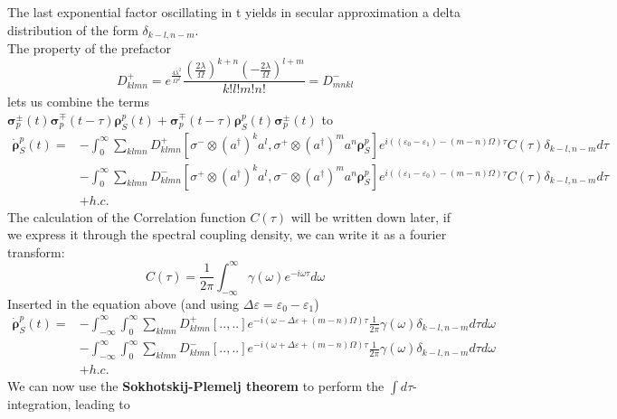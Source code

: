 	The last exponential factor oscillating in t yields in secular approximation a delta distribution of the form $\delta_{k-l, n-m}$.\\
	The property of the prefactor
	\begin{equation}
		D_{klmn}^+ =	e^{\frac{4\lambda^2}{\Omega^2}} \frac{\left(\frac{2\lambda}{\Omega}\right)^{k + n} \left(-\frac{2\lambda}{\Omega}\right)^{l + m}}{k! l! m! n!} =	D_{mnkl}^-
	\end{equation}
	lets us combine the terms $\boldsymbol{\sigma}_p^\pm(t)\boldsymbol{\sigma}_p^\mp(t- \tau) \boldsymbol{\rho}_S^p(t) + \boldsymbol{\sigma}_p^\mp(t- \tau) \boldsymbol{\rho}_S^p(t)\boldsymbol{\sigma}_p^\pm(t)$ to
	\begin{align*}
		\dot{\boldsymbol{\rho}}_S^p(t) =	&- \int_{0}^{\infty} \sum_{klmn}^{} D_{klmn}^+ \left[\sigma^- \otimes (a^\dagger)^k a^l, \sigma^+ \otimes (a^\dagger)^m a^n \boldsymbol{\rho}_S^p\right] e^{i((\varepsilon_0 - \varepsilon_1) - (m-n)\Omega) \tau} C(\tau) \delta_{k-l, n-m} d\tau \\
		&- \int_{0}^{\infty} \sum_{klmn}^{} D_{klmn}^- \left[\sigma^+ \otimes (a^\dagger)^k a^l, \sigma^- \otimes (a^\dagger)^m a^n \boldsymbol{\rho}_S^p\right] e^{i((\varepsilon_1 - \varepsilon_0) - (m-n)\Omega) \tau} C(\tau) \delta_{k-l, n-m} d\tau \\
		&+ h.c.
	\end{align*}
	The calculation of the Correlation function $C(\tau)$ will be written down later, if we express it through the spectral coupling density, we can write it as a fourier transform:
	\begin{equation}
		C(\tau) =	\frac{1}{2 \pi} \int_{-\infty}^{\infty} \gamma(\omega) e^{-i \omega \tau}d\omega
	\end{equation}
	Inserted in the equation above (and using $\Delta \varepsilon =	\varepsilon_0 - \varepsilon_1$)
	\begin{align*}
		\dot{\boldsymbol{\rho}}_S^p(t) =	&- \int_{-\infty}^{\infty}\int_{0}^{\infty} \sum_{klmn}^{} D_{klmn}^+ \left[..,..\right] e^{-i(\omega - \Delta \varepsilon + (m-n)\Omega) \tau} \frac{1}{2\pi}\gamma(\omega) \delta_{k-l, n-m} d\tau d\omega \\
		&- \int_{-\infty}^{\infty} \int_{0}^{\infty} \sum_{klmn}^{} D_{klmn}^- \left[.., ..\right] e^{-i(\omega + \Delta \varepsilon + (m-n)\Omega) \tau} \frac{1}{2\pi}\gamma(\omega) \delta_{k-l, n-m} d\tau d\omega \\
		&+ h.c.
	\end{align*}
	We can now use the \textbf{Sokhotskij-Plemelj theorem} to perform the $\int d\tau$- integration, leading to
